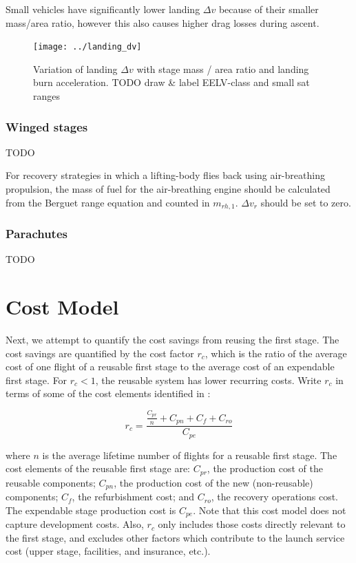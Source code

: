 \documentclass[conf]{new-aiaa}
\begin{document}
Small vehicles have significantly lower landing $\Delta v$ because of their smaller mass/area ratio, however this also causes higher drag losses during ascent.

\begin{figure}[hbt!]
	\centering
	\texttt{[image: ../landing\_dv]}
	\label{fig:landing_dv}
	\caption{Variation of landing $\Delta v$ with stage mass / area ratio and landing burn acceleration. TODO draw \& label EELV-class and small sat ranges}
\end{figure}


\subsubsection{Winged stages}
TODO

For recovery strategies in which a lifting-body flies back using air-breathing propulsion, the mass of fuel for the air-breathing engine should be calculated from the Berguet range equation and counted in $m_{rh,1}$. $\Delta v_r$ should be set to zero.


\subsubsection{Parachutes}
TODO







\section{Cost Model}
Next, we attempt to quantify the cost savings from reusing the first stage. The cost savings are quantified by the cost factor $r_c$, which is the ratio of the average cost of one flight of a reusable first stage to the average cost of an expendable first stage. For $r_c < 1$, the reusable system has lower recurring costs. Write $r_c$ in terms of some of the cost elements identified in \cite{Sforza2015}:

\begin{equation}
\label{eq:cost_elements}
r_c = \frac{\frac{C_{pr}}{n} + C_{pn} + C_f + C_{ro}}{C_{pe}}
\end{equation}

where $n$ is the average lifetime number of flights for a reusable first stage. The cost elements of the reusable first stage are: $C_{pr}$, the production cost of the reusable components; $C_{pn}$, the production cost of the new (non-reusable) components; $C_f$, the refurbishment cost; and $C_{ro}$, the recovery operations cost. The expendable stage production cost is $C_{pe}$. Note that this cost model does not capture development costs. Also, $r_c$ only includes those costs directly relevant to the first stage, and excludes other factors which contribute to the launch service cost (upper stage, facilities, and insurance, etc.).
\end{document}
